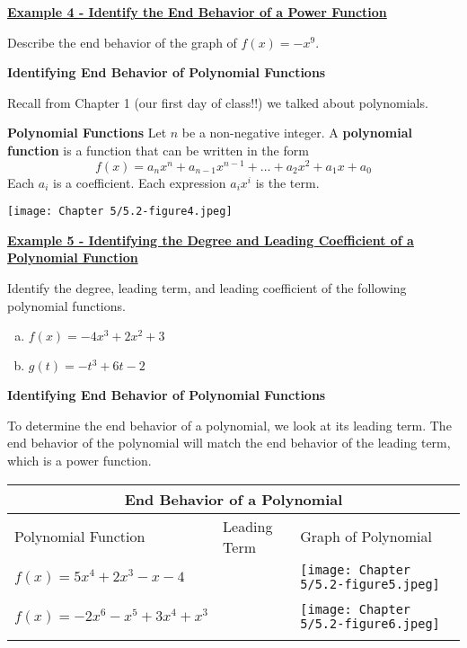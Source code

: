 \documentclass[12pt]{book}
\begin{document}
\underline{\textbf{Example 4 - Identify the End Behavior of a Power Function}}

Describe the end behavior of the graph of $f(x)=-x^9$.


\newpage
{\large \textbf{Identifying End Behavior of Polynomial Functions}}
    
Recall from Chapter 1 (our first day of class!!) we talked about polynomials.

\begin{boxR}
   \textbf{Polynomial Functions}
   \vspace{1mm}
   \hline
   \vspace{2mm}
   Let $n$ be a non-negative integer. A \textbf{polynomial function} is a function that can be written in the form
   $$ f(x)=a_nx^n + a_{n-1}x^{n-1}+ \ldots + a_2x^2 + a_1x +a_0$$
   Each $a_i$ is a coefficient. Each expression $a_ix^i$ is the term.
\end{boxR}

\centerline{\texttt{[image: Chapter 5/5.2-figure4.jpeg]}}

\bigskip
\underline{\textbf{Example 5 - Identifying the Degree and Leading Coefficient of a Polynomial Function}}

Identify the degree, leading term, and leading coefficient of the following polynomial functions. 
\begin{enumerate}[(a)]
    \item $f(x)= -4x^3+2x^2+3$
    \vspace{30mm}
    \item $g(t)= -t^3+6t-2$
\end{enumerate}

\newpage

{\large \textbf{Identifying End Behavior of Polynomial Functions}}

To determine the end behavior of a polynomial, we look at its leading term. The end behavior of the polynomial will match the end behavior of the leading term, which is a power function.
\vspace{3mm}


\begin{center}
\renewcommand{\arraystretch}{1.7} %
\begin{tabular}{|m{5cm}|m{4cm}|m{7cm}|}
\hline
\multicolumn{3}{|c|}{End Behavior of a Polynomial} \\
\hline
Polynomial Function & Leading Term & Graph of Polynomial \\
\hline
$f(x) = 5x^4+2x^3-x-4$ &  & \texttt{[image: Chapter 5/5.2-figure5.jpeg]} \\
 &  &  \\
\hline
$f(x)=-2x^6-x^5+3x^4+x^3$ & & \texttt{[image: Chapter 5/5.2-figure6.jpeg]} \\
&  &  \\
\hline
\end{tabular}
\end{center}
\end{document}
